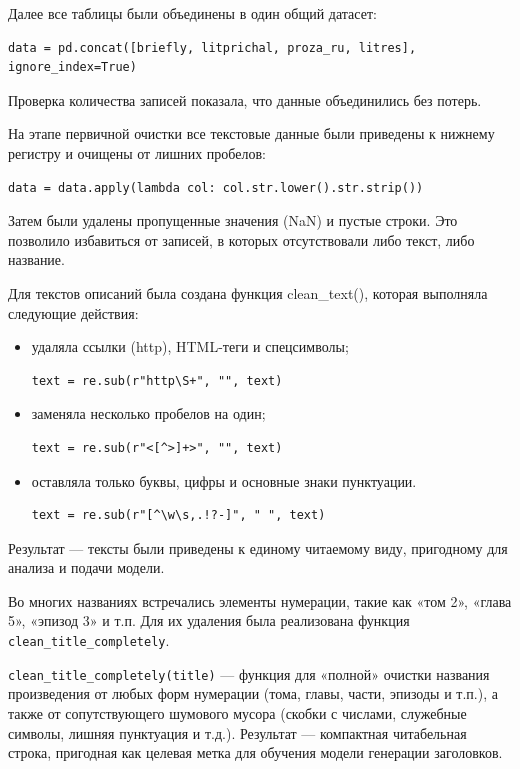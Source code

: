 \documentclass[coursework]{SCWorks}
\begin{document}
    Далее все таблицы были объединены в один общий датасет:

    \begin{verbatim}
data = pd.concat([briefly, litprichal, proza_ru, litres], ignore_index=True)
    \end{verbatim}


    Проверка количества записей показала, что данные объединились без потерь.


    На этапе первичной очистки все текстовые данные были приведены к нижнему регистру и очищены от лишних пробелов:
    \begin{verbatim}
data = data.apply(lambda col: col.str.lower().str.strip())
    \end{verbatim}


    Затем были удалены пропущенные значения (NaN) и пустые строки.
    Это позволило избавиться от записей, в которых отсутствовали либо текст, либо название.

    Для текстов описаний была создана функция clean\_text(), которая выполняла следующие действия:

    \begin{itemize}
        \item удаляла ссылки (http), HTML-теги и спецсимволы;
        \begin{verbatim}
text = re.sub(r"http\S+", "", text)
        \end{verbatim}
        \item заменяла несколько пробелов на один;
        \begin{verbatim}
text = re.sub(r"<[^>]+>", "", text)
        \end{verbatim}
        \item оставляла только буквы, цифры и основные знаки пунктуации.
        \begin{verbatim}
text = re.sub(r"[^\w\s,.!?-]", " ", text)
        \end{verbatim}
    \end{itemize}

    Результат — тексты были приведены к единому читаемому виду, пригодному для анализа и подачи модели.

    Во многих названиях встречались элементы нумерации, такие как «том 2», «глава 5», «эпизод 3» и т.п.
    Для их удаления была реализована функция \texttt{clean\_title\_completely}.


    \texttt{clean\_title\_completely(title)} — функция для «полной» очистки названия произведения от любых форм нумерации (тома, главы, части,
    эпизоды и т.п.), а также от сопутствующего шумового мусора (скобки с числами, служебные символы, лишняя пунктуация и т.д.).
    Результат — компактная читабельная строка, пригодная как целевая метка для обучения модели генерации заголовков.
\end{document}
